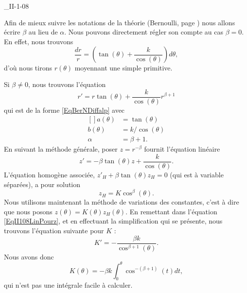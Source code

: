 

\begin{corrige}{_II-1-08}

Afin de mieux suivre les notations de la théorie (Bernoulli, page \pageref{SubSecBernh}) nous allons écrire $\beta$ au lieu de $\alpha$. Nous pouvons directement régler son compte au cas $\beta=0$. En effet, nous trouvons
\begin{equation}
	\frac{ dr }{ r }=\left( \tan(\theta)+\frac{ k }{ \cos(\theta) } \right)d\theta,
\end{equation}
d'où nous tirons $r(\theta)$ moyennant une simple primitive.

Si $\beta\neq 0$, nous trouvons l'équation
\begin{equation}
	r'=r\tan(\theta)+\frac{ k }{ \cos(\theta) }r^{\beta+1}
\end{equation}
qui est de la forme \eqref{EqBerNDiffalp} avec
\begin{equation}
	\begin{aligned}[]
		a(\theta)	&=\tan(\theta)\\
		b(\theta)	&=k/\cos(\theta)\\
		\alpha		&=\beta+1.
	\end{aligned}
\end{equation}
En suivant la méthode générale, poser $z=r^{-\beta}$ fournit l'équation linéaire
\begin{equation}		\label{EqII108LinPourz}
	z'=-\beta\tan(\theta) z+\frac{ k }{ \cos(\theta) }.
\end{equation}
L'équation homogène associée, $z'_H+\beta\tan(\theta)z_H=0$ (qui est à variable séparées), a pour solution
\begin{equation}
	z_H=K\cos^{\beta}(\theta).
\end{equation}
Nous utilisons maintenant la méthode de variations des constantes, c'est à dire que nous posons $z(\theta)=K(\theta)z_H(\theta)$. En remettant dans l'équation \ref{EqII108LinPourz}, et en effectuant la simplification qui se présente, nous trouvons l'équation suivante pour $K$ :
\begin{equation}
	K'=-\frac{ \beta k }{ \cos^{\beta+1}(\theta) }.
\end{equation}
Nous avons donc
\begin{equation}
	K(\theta)=-\beta k\int_0^{\theta}\cos^{-(\beta+1)}(t)dt,
\end{equation}
qui n'est pas une intégrale facile à calculer.


\end{corrige}
